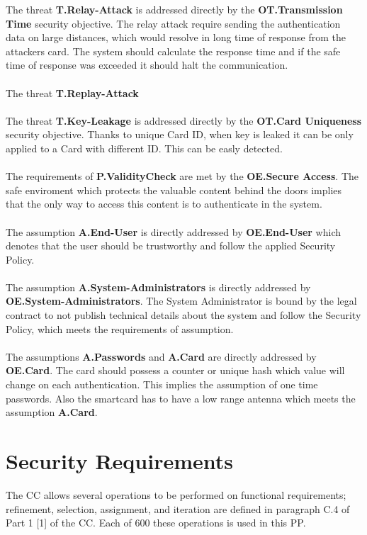 \documentclass[10pt,titlepage]{article}
\begin{document}
The threat \textbf{T.Relay-Attack} is addressed directly by the \textbf{OT.Transmission Time} security objective. The relay attack require sending the authentication data on large distances, which would resolve in long time of response from the attackers card. The system should calculate the response time and if the safe time of response was exceeded it should halt the communication.
\\ \\
The threat \textbf{T.Replay-Attack}
\\ \\
The threat \textbf{T.Key-Leakage} is addressed directly by the \textbf{OT.Card Uniqueness} security objective. Thanks to unique Card ID, when key is leaked it can be only applied to a Card with different ID. This can be easly detected.
\\ \\
The requirements of \textbf{P.ValidityCheck}  are met by the \textbf{OE.Secure Access}. The safe enviroment which protects the valuable content behind the doors implies that the only way to access this content is to authenticate in the system.
\\ \\
The assumption \textbf{A.End-User} is directly addressed by \textbf{OE.End-User} which denotes that the user should be trustworthy and follow the applied Security Policy.
\\ \\
The assumption \textbf{A.System-Administrators} is directly addressed by \textbf{OE.System-Administrators}. The System Administrator is bound by the legal contract to not publish technical details about the system and follow the Security Policy, which meets the requirements of assumption.
\\ \\
The assumptions \textbf{A.Passwords} and \textbf{A.Card} are directly addressed by \textbf{OE.Card}. The card should possess a counter or unique hash which value will change on each authentication. This implies the assumption of one time passwords. Also the smartcard has to have a low range antenna which meets the assumption \textbf{A.Card}.

\section{Security Requirements}

The CC allows several operations to be performed on functional requirements; refinement,
selection, assignment, and iteration are defined in paragraph C.4 of Part 1 [1] of the CC. Each of 600 these operations is used in this PP.
\end{document}

